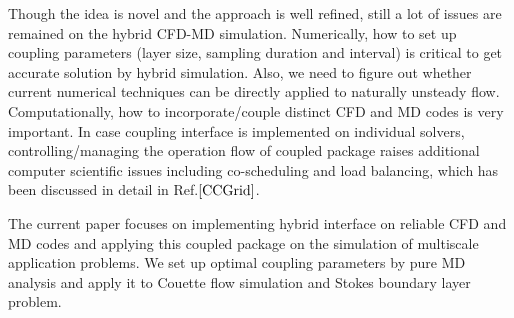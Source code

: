 \documentclass{CFD2010paper}
\begin{document}
%



Though the idea is novel and the approach is well refined, still a lot of issues are remained on the hybrid CFD-MD simulation. Numerically, how to set up coupling parameters (layer size, sampling duration and interval) is critical to get accurate solution by hybrid simulation. Also, we need to figure out whether current numerical techniques can be directly applied to naturally unsteady flow. Computationally, how to incorporate/couple distinct CFD and MD codes is very important. In case coupling interface is implemented on individual solvers, controlling/managing the operation flow of coupled package raises additional computer scientific issues including co-scheduling and load balancing, which has been discussed in detail in Ref.${\cite{CCGrid}}$.

The current paper focuses on implementing hybrid interface on reliable CFD and MD codes and applying this coupled package on the simulation of multiscale application problems. We set up optimal coupling parameters by pure MD analysis and apply it to Couette flow simulation and Stokes boundary layer problem.
\end{document}

